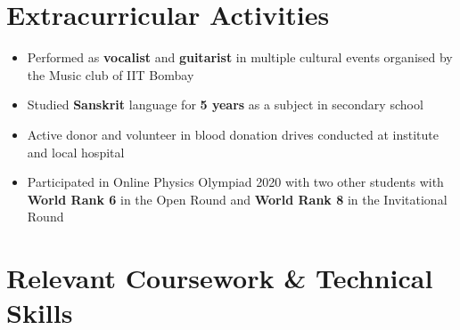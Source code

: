 \documentclass[10pt,letterpaper,sans]{moderncv}        %
\begin{document}
\section{Extracurricular Activities}

\begin{itemize}
\item Performed as \textbf{vocalist} and \textbf{guitarist} in multiple cultural events organised by the Music club of IIT Bombay
\item Studied \textbf{Sanskrit} language for \textbf{5 years} as a subject in secondary school
\item Active donor and volunteer in blood donation drives conducted at institute and local hospital
\item Participated in Online Physics Olympiad 2020 with two other students with \textbf{World Rank 6} in the Open Round and \textbf{World Rank 8} in the Invitational Round
\end{itemize}

\section{Relevant Coursework \& Technical Skills} 
\end{document}
